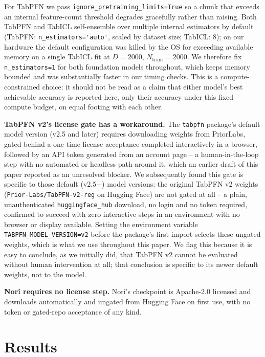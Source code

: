 \documentclass{article}
\begin{document}
For TabPFN we pass \verb|ignore_pretraining_limits=True| so a chunk that exceeds an
internal feature-count threshold degrades gracefully rather than raising. Both TabPFN
and TabICL self-ensemble over multiple internal estimators by default (TabPFN:
\verb|n_estimators='auto'|, scaled by dataset size; TabICL: 8); on our hardware the
default configuration was killed by the OS for exceeding available memory on a single
TabICL fit at $D{=}2000$, $N_{\text{train}}{=}2000$. We therefore fix
\verb|n_estimators=1| for both foundation models throughout, which keeps memory bounded
and was substantially faster in our timing checks. This is a compute-constrained choice: it
should not be read as a claim that either model's best achievable accuracy is reported
here, only their accuracy under this fixed compute budget, on equal footing with each
other.

\textbf{TabPFN v2's license gate has a workaround.} The \texttt{tabpfn} package's
default model version (v2.5 and later) requires downloading weights from PriorLabs,
gated behind a one-time license acceptance completed interactively in a browser,
followed by an API token generated from an account page -- a human-in-the-loop step
with no automated or headless path around it, which an earlier draft of this paper
reported as an unresolved blocker. We subsequently found this gate is specific to
those default (v2.5+) model versions: the original TabPFN v2 weights
(\texttt{Prior-Labs/TabPFN-v2-reg} on Hugging Face) are not gated at all -- a plain,
unauthenticated \texttt{huggingface\_hub} download, no login and no token required,
confirmed to succeed with zero interactive steps in an environment with no browser or
display available. Setting the environment variable \texttt{TABPFN\_MODEL\_VERSION=v2}
before the package's first import selects these ungated weights, which is what we use
throughout this paper. We flag this because it is easy to conclude, as we initially
did, that TabPFN v2 cannot be evaluated without human intervention at all; that
conclusion is specific to its newer default weights, not to the model.

\textbf{Nori requires no license step.} Nori's checkpoint is Apache-2.0 licensed and
downloads automatically and ungated from Hugging Face on first use, with no token or
gated-repo acceptance of any kind.

\section{Results}
\label{sec:results}
\end{document}
